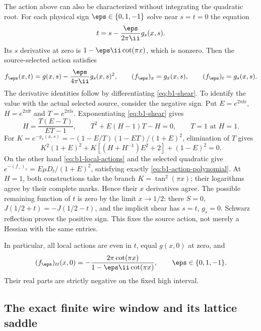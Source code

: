 The action above can also be characterized without integrating the
quadratic root. For each physical sign $\eps\in\{0,1,-1\}$ solve
near $s=t=0$ the equation
\begin{equation}\label{eq:b1-shear}
 t=s-\frac{\eps}{2\pi\ii}g_s(x,s).
\end{equation}
Its $s$ derivative at zero is $1-\eps\ii\cot(\pi x)$, which is
nonzero. Then the source-selected action satisfies
\begin{equation}\label{eq:b1-shear-action}
 f_\eps(x,t)=g(x,s)-\frac{\eps}{4\pi\ii}g_s(x,s)^2,
 \qquad (f_\eps)_x=g_x(x,s),\qquad (f_\eps)_t=g_s(x,s).
\end{equation}
The derivative identities follow by differentiating
\eqref{eq:b1-shear}. To identify the value with the actual selected
source, consider the negative sign. Put
$E=e^{2\pi\ii x}$, $H=e^{2\pi\ii t}$ and $T=e^{2\pi\ii s}$.
Exponentiating \eqref{eq:b1-shear} gives
\[
 H=\frac{T(E-T)}{ET-1},\qquad
 T^2+E(H-1)T-H=0,
 \qquad T=1\text{ at }H=1.
\]
For $K=e^{-g_x(x,s)}=-(1-E/T)(1-ET)/(1+E)^2$, elimination of $T$
gives
\begin{equation}\label{eq:b1-action-polynomial}
 K^2(1+E)^2+K[(H+H^{-1})E^2+2]+(1-E)^2=0.
\end{equation}
On the other hand \eqref{eq:b1-local-actions} and the selected quadratic
give $e^{-(f_-)_x}=E\mu D_t/(1+E)^2$, satisfying exactly
\eqref{eq:b1-action-polynomial}. At $H=1$, both constructions take
the branch $K=\tan^2(\pi x)$; their logarithms agree by their complete
marks. Hence their $x$ derivatives agree. The possible remaining function
of $t$ is zero by the limit $x\to1/2$: there $S=0$,
$J(1/2+t)=-J(1/2-t)$, and the implicit shear has $s=t$, $g_s=0$.
Schwarz reflection proves the positive sign. This fixes the source
action, not merely a Hessian with the same entries.

In particular, all local actions are even in $t$, equal $g(x,0)$ at
zero, and
\begin{equation}\label{eq:b1-local-hessian}
 (f_\eps)_{tt}(x,0)
 =-\frac{2\pi\cot(\pi x)}{1-\eps\ii\cot(\pi x)},
 \qquad \eps\in\{0,1,-1\}.
\end{equation}
Their real parts are strictly negative on the fixed high interval.

\subsection{The exact finite wire window and its lattice saddle}
\label{app:lattice-laplace}

